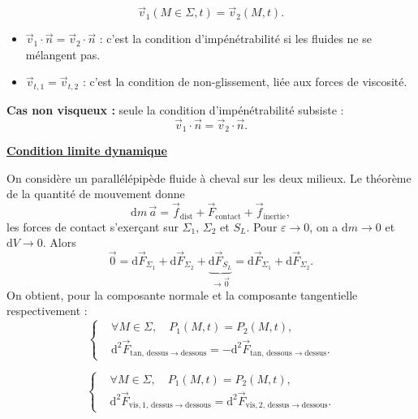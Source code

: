 \documentclass[11pt,a4paper]{article}
\newcommand{\dd}{\mathrm d}
\newcommand{\vv}{\vec v}
\newcommand{\titr}[1]{\par\needspace{4\baselineskip}\textbf{\underline{#1}}\par}
\begin{document}
\[\vv_1(M\in\Sigma,t)=\vv_2(M,t).\]
\begin{itemize}
\item $\vv_1\cdot\vec n=\vv_2\cdot\vec n$ : c'est la condition d'impénétrabilité si les fluides ne se mélangent pas.
\item $\vec v_{t,1}=\vec v_{t,2}$ : c'est la condition de non-glissement, liée aux forces de viscosité.
\end{itemize}
\textbf{Cas non visqueux :} seule la condition d'impénétrabilité subsiste :
\[\vv_1\cdot\vec n=\vv_2\cdot\vec n.\]
\titr{Condition limite dynamique}
\begin{center}\end{center}
On considère un parallélépipède fluide à cheval sur les deux milieux. Le théorème de la quantité de mouvement donne
\[\dd m\,\vec a=\vec f_{\mathrm{dist}}+\vec F_{\mathrm{contact}}+\vec f_{\mathrm{inertie}},\]
les forces de contact s'exerçant sur $\Sigma_1$, $\Sigma_2$ et $S_L$.
Pour $\varepsilon\to0$, on a $\dd m\to0$ et $\dd V\to0$. Alors
\[\vec0=\dd\vec F_{\Sigma_1}+\dd\vec F_{\Sigma_2}+\underbrace{\dd\vec F_{S_L}}_{\to\vec0}
=\dd\vec F_{\Sigma_1}+\dd\vec F_{\Sigma_2}.\]
On obtient, pour la composante normale et la composante tangentielle respectivement :
\[\left\{\begin{aligned}
&\forall M\in\Sigma,\quad P_1(M,t)=P_2(M,t),\\
&\dd^2\vec F_{\mathrm{tan},\,\text{dessus}\to\text{dessous}}
=-\dd^2\vec F_{\mathrm{tan},\,\text{dessous}\to\text{dessus}}.
\end{aligned}\right.\]
\begin{cadre}\[\left\{\begin{aligned}
&\forall M\in\Sigma,\quad P_1(M,t)=P_2(M,t),\\
&\dd^2\vec F_{\mathrm{vis},1,\,\text{dessus}\to\text{dessous}}
=\dd^2\vec F_{\mathrm{vis},2,\,\text{dessus}\to\text{dessous}}.
\end{aligned}\right.\]\end{cadre}
\end{document}
